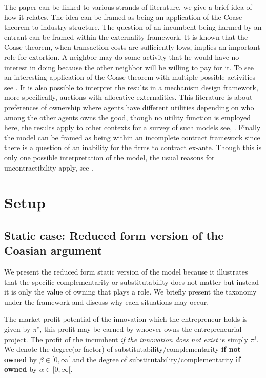 The paper can be linked to various strands of literature, we give a brief idea of how it relates. The idea can be framed as being an application of the Coase theorem to industry structure. The question of an incumbent being harmed by an entrant can be framed within the externality framework. It is known that the Coase theorem, when transaction costs are sufficiently lows, implies an important role for extortion. A neighbor may do some activity that he would have no interest in doing because the other neighbor will be willing to pay for it. To see an interesting application of the Coase theorem with multiple possible activities see \cite{Kuechle2012}. It is also possible to interpret the results in a mechanism design framework, more specifically, auctions with allocative externalities. This literature is about preferences of ownership where agents have different utilities depending on who among the other agents owns the good, though no utility function is employed here, the results apply to other contexts for a survey of such models see, \cite{Jehiel2005}. Finally the model can be framed as being within an incomplete contract framework since there is a question of an inability for the firms to contract ex-ante. Though this is only one possible interpretation of the model, the usual reasons for uncontractibility apply, see \cite{Hart1999}.

\section{Setup}\label{setup}

\subsection{Static case: Reduced form version of the Coasian argument}\label{static}

We present the reduced form static version of the model because it illustrates that the specific complementarity or substitutability does not matter but instead it is only the  value of owning that plays a role.  We briefly present the taxonomy under the framework and discuss why each situations may occur. 

The market profit potential of the innovation which the entrepreneur holds is given by $\pi^e$, this profit may be earned by whoever owns the entrepreneurial project. The profit of the incumbent \textit{if the innovation does not exist} is simply $\pi^i$. We denote the degree(or factor) of substitutability/complementarity \textbf{if not owned} by $\beta \in [ 0, \infty [$ and the degree of substitutability/complementarity  \textbf{if owned} by $\alpha \in [0, \infty [ $. 

